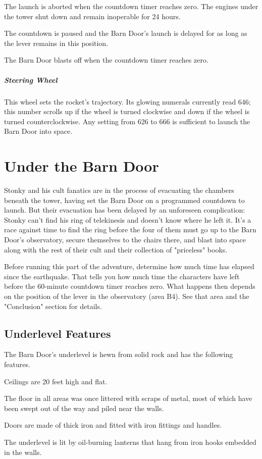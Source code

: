 \documentclass[10pt,a4paper,twoside,bg=print,twocolumn,openany,nodeprecatedcode]{dndbook}
\begin{document}
\begin{description}[nolistsep]
\item[Coop]
The launch is aborted when the countdown timer reaches zero. The engines under the tower shut down and remain inoperable for 24 hours.
\item[Shed]
The countdown is paused and the Barn Door's launch is delayed for as long as the lever remains in this position.
\item[Stable]
The Barn Door blasts off when the countdown timer reaches zero.
\end{description}

\subparagraph{Steering Wheel}
This wheel sets the rocket's trajectory. Its glowing numerals currently read 646; this number scrolls up if the wheel is turned clockwise and down if the wheel is turned counterclockwise. Any setting from 626 to 666 is sufficient to launch the Barn Door into space.

\section{Under the Barn Door}
Stonky and his cult fanatics are in the process of evacuating the chambers beneath the tower, having set the Barn Door on a programmed countdown to launch. But their evacuation has been delayed by an unforeseen complication: Stonky can't find his ring of telekinesis and doesn't know where he left it. It's a race against time to find the ring before the four of them must go up to the Barn Door's observatory, secure themselves to the chairs there, and blast into space along with the rest of their cult and their collection of "priceless" books.

Before running this part of the adventure, determine how much time has elapsed since the earthquake. That tells you how much time the characters have left before the 60-minute countdown timer reaches zero. What happens then depends on the position of the lever in the observatory (area B4). See that area and the "Conclusion" section for details.

\subsection{Underlevel Features}
The Barn Door's underlevel is hewn from solid rock and has the following features.


\begin{description}[nolistsep]
\item[Ceilings]
Ceilings are 20 feet high and flat.
\item[Debris]
The floor in all areas was once littered with scraps of metal, most of which have been swept out of the way and piled near the walls.
\item[Doors]
Doors are made of thick iron and fitted with iron fittings and handles.
\item[Light]
The underlevel is lit by oil-burning lanterns that hang from iron hooks embedded in the walls.
\end{description}
\end{document}
